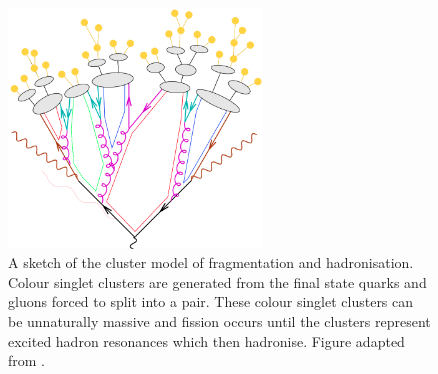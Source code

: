 \begin{figure}[htpb]
	\centering
	\includegraphics[width=0.6\textwidth]{Figures/Generator_Cluster}
	\caption[A sketch of the cluster model of fragmentation and hadronisation. Colour singlet clusters are generated from the final state quarks and gluons forced to split into a \qqbar{} pair. These colour singlet clusters can be unnaturally massive and fission occurs until the clusters represent excited hadron resonances which then hadronise. ]{A sketch of the cluster model of fragmentation and hadronisation. Colour singlet clusters are generated from the final state quarks and gluons forced to split into a \qqbar{} pair. These colour singlet clusters can be unnaturally massive and fission occurs until the clusters represent excited hadron resonances which then hadronise.  Figure adapted from \cite{Gen:Cluster}.}
	\label{fig:Cluster}
\end{figure}









